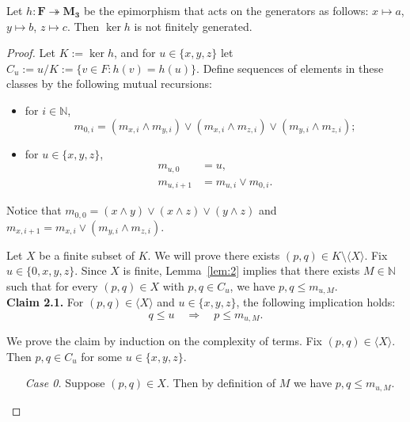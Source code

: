 \begin{theorem}
Let $h\colon \mathbf{F} \twoheadrightarrow \mathbf{M_3}$ be the epimorphism that acts on the generators as follows: $x\mapsto a$, $y\mapsto b$, $z\mapsto c.$ Then $\operatorname{ker} h$ is not finitely generated.
\end{theorem}
\begin{proof}
Let $K := \operatorname{ker} h$, and for $u \in \{x, y, z\}$ let $C_u := u/K := \{v \in F : h(v) = h(u)\}$.
Define sequences of elements in these classes by the following mutual recursions:
\begin{itemize}
\item for $i \in \mathbb N$,  
  \[m_{0, i} = (m_{x,i} \wedge m_{y,i}) \vee (m_{x,i} \wedge m_{z,i})\vee (m_{y,i} \wedge m_{z,i});\]

\item for $u \in \{x, y, z\}$,   
  \begin{align*}
    m_{u,0} &= u,\\  
    m_{u, i+1} &= m_{u, i}\vee m_{0,i}.
  \end{align*}
\end{itemize}

\noindent Notice that
$m_{0, 0} = (x\wedge y) \vee (x\wedge z)\vee (y\wedge z)$ and $m_{x, i+1} = m_{x,i} \vee (m_{y,i} \wedge m_{z,i})$.  

Let $X$ be a finite subset of $K$.  We will prove there exists $(p,q) \in K \setminus \langle X \rangle$.  
Fix $u\in \{0, x, y, z\}$. Since $X$ is finite, Lemma~\ref{lem:2} implies that there exists $M \in \mathbb{N}$ such that for every $(p, q) \in X$ with $p, q \in C_u$, we have $p, q \leqslant m_{u, M}$.\\[6pt]
{\bf Claim 2.1.} For $(p,q) \in \langle X \rangle$ and $u \in \{x, y, z\}$, the following implication holds:
\begin{equation}
  \label{eq:star}
q \leqslant u \quad \Longrightarrow \quad p\leqslant m_{u, M}.
\end{equation}

We prove the claim by induction on the complexity of terms.
Fix $(p,q) \in \langle X \rangle$. Then $p, q \in C_u$ for some $u\in \{x, y, z\}$.
\begin{itemize}
\item[{\it Case 0.}] Suppose $(p, q) \in X$. Then by definition of $M$ we have $p, q \leqslant m_{u, M}$.


\end{itemize}
\end{proof}
